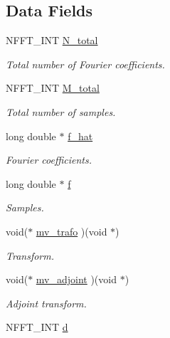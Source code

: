 \subsection*{Data Fields}
\begin{DoxyCompactItemize}
\item 
N\-F\-F\-T\-\_\-\-I\-N\-T \hyperlink{structnfctl__plan_affb9b7c2d4e7c5b37954ec7f2e040842}{N\-\_\-total}
\begin{DoxyCompactList}\small\item\em Total number of Fourier coefficients. \end{DoxyCompactList}\item 
N\-F\-F\-T\-\_\-\-I\-N\-T \hyperlink{structnfctl__plan_a6dc9d1ee3a4b66708cc57410f83dd4e9}{M\-\_\-total}
\begin{DoxyCompactList}\small\item\em Total number of samples. \end{DoxyCompactList}\item 
long double $\ast$ \hyperlink{structnfctl__plan_aede4fbbe9a7b666d5d5fbd62e62bf103}{f\-\_\-hat}
\begin{DoxyCompactList}\small\item\em Fourier coefficients. \end{DoxyCompactList}\item 
long double $\ast$ \hyperlink{structnfctl__plan_ae09e0a759e136ad020a97e6c76efbb30}{f}
\begin{DoxyCompactList}\small\item\em Samples. \end{DoxyCompactList}\item 
void($\ast$ \hyperlink{structnfctl__plan_a42f0c32b080677a57f82ccf23d018da2}{mv\-\_\-trafo} )(void $\ast$)
\begin{DoxyCompactList}\small\item\em Transform. \end{DoxyCompactList}\item 
void($\ast$ \hyperlink{structnfctl__plan_a99191484b327c3283f3aed8c3e9a3d70}{mv\-\_\-adjoint} )(void $\ast$)
\begin{DoxyCompactList}\small\item\em Adjoint transform. \end{DoxyCompactList}\item 
\hypertarget{structnfctl__plan_aff51773fc50fcaf86b2168eaf565aa89}{N\-F\-F\-T\-\_\-\-I\-N\-T \hyperlink{structnfctl__plan_aff51773fc50fcaf86b2168eaf565aa89}{d}}\label{structnfctl__plan_aff51773fc50fcaf86b2168eaf565aa89}


\end{DoxyCompactItemize}
